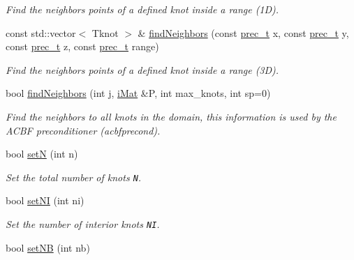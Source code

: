 \begin{CompactItemize}
\begin{CompactList}\small\item\em Find the neighbors points of a defined knot inside a range (1D). \item\end{CompactList}\item 
const std::vector$<$ Tknot $>$ \& \hyperlink{classKnots_b55324d1c79e72a5bb657639db26fed7}{findNeighbors} (const \hyperlink{Traits_8hpp_81f62fadeebafe942380746e380c72a5}{prec\_\-t} x, const \hyperlink{Traits_8hpp_81f62fadeebafe942380746e380c72a5}{prec\_\-t} y, const \hyperlink{Traits_8hpp_81f62fadeebafe942380746e380c72a5}{prec\_\-t} z, const \hyperlink{Traits_8hpp_81f62fadeebafe942380746e380c72a5}{prec\_\-t} range)
\begin{CompactList}\small\item\em Find the neighbors points of a defined knot inside a range (3D). \item\end{CompactList}\item 
bool \hyperlink{classKnots_2c5bd54aa20e1911a4aad58e71c111d7}{findNeighbors} (int j, \hyperlink{Traits_8hpp_a667f32088e1c93b532a640fe84dc4cd}{iMat} \&P, int max\_\-knots, int sp=0)
\begin{CompactList}\small\item\em Find the neighbors to all knots in the domain, this information is used by the ACBF preconditioner (acbfprecond). \item\end{CompactList}\item 
\hypertarget{classKnots_f94950c8e1a190efb214f9c252d04cc0}{
bool \hyperlink{classKnots_f94950c8e1a190efb214f9c252d04cc0}{setN} (int n)}
\label{classKnots_f94950c8e1a190efb214f9c252d04cc0}

\begin{CompactList}\small\item\em Set the total number of knots {\tt N}. \item\end{CompactList}\item 
\hypertarget{classKnots_6e06ab0548d4650dfe4032a54e185fcd}{
bool \hyperlink{classKnots_6e06ab0548d4650dfe4032a54e185fcd}{setNI} (int ni)}
\label{classKnots_6e06ab0548d4650dfe4032a54e185fcd}

\begin{CompactList}\small\item\em Set the number of interior knots {\tt NI}. \item\end{CompactList}\item 
\hypertarget{classKnots_6c3f0bb405c52c2f8aec5599adec81bb}{
bool \hyperlink{classKnots_6c3f0bb405c52c2f8aec5599adec81bb}{setNB} (int nb)}
\label{classKnots_6c3f0bb405c52c2f8aec5599adec81bb}


\end{CompactItemize}
